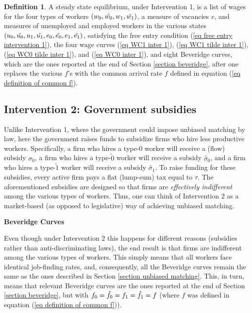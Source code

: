\documentclass[12pt]{article} %
\theoremstyle{definition}
\newtheorem{definition}{Definition}%
\begin{document}
\bigskip 

\begin{definition}\label{definition equil inter 1}
    A steady state equilibrium, under Intervention 1, is a list of wages for the four types of workers $(w_0, \Tilde{w_0}, w_1, \Tilde{w_1})$, a measure of vacancies $v$, and measures of unemployed and employed workers in the various states $(u_0, \Tilde{u_0}, u_1, \Tilde{u_1}, e_0, \Tilde{e_0}, e_1, \Tilde{e_1})$, satisfying the free entry condition (\ref{eq free entry intervention 1}), the four wage curves (\ref{eq WC1 inter 1}), (\ref{eq WC1 tilde inter 1}), (\ref{eq WC0 tilde inter 1}), and (\ref{eq WC0 inter 1}), and eight Beveridge curves, which are the ones reported at the end of Section \ref{section beveridge}, after one replaces the various $f$'s with the common arrival rate $f$ defined in equation (\ref{eq definition of common f}).
\end{definition} 



\subsection{Intervention 2: Government subsidies}\label{section government subsidies}


Unlike Intervention 1, where the government could impose unbiased matching by law, here the government raises funds to subsidize firms who hire less productive workers. Specifically, a firm who hires a type-0 worker will receive a (flow) subsidy $\sigma_0$, a firm who hires a type-$\tilde{0}$ worker will receive a subsidy $\tilde{\sigma_0}$, and a firm who hires a type-$\tilde{1}$ worker will receive a subsidy $\tilde{\sigma_1 }$. To raise funding for these subsidies, every active firm pays a flat (lump-sum) tax equal to $\tau$. The aforementioned subsidies are designed so that firms are \textit{effectively indifferent} among the various types of workers. Thus, one can think of Intervention 2 as a market-based (as opposed to legislative) way of achieving unbiased matching. 


\bigskip 

\noindent \textbf{Beveridge Curves} 

\noindent Even though under Intervention 2 this happens for different reasons (subsidies rather than anti-discriminating laws), the end result is that firms are indifferent among the various types of workers. This simply means that all workers face identical job-finding rates, and, consequently, all the Beveridge curves remain the same as the ones described in Section \ref{section unbiased matching}. This, in turn, means that relevant Beveridge curves are the ones reported at the end of Section \ref{section beveridge}, but with $f_0=\Tilde{f_0}=f_1=\Tilde{f_1}=f$ (where $f$ was defined in equation (\ref{eq definition of common f})). 
\end{document}

